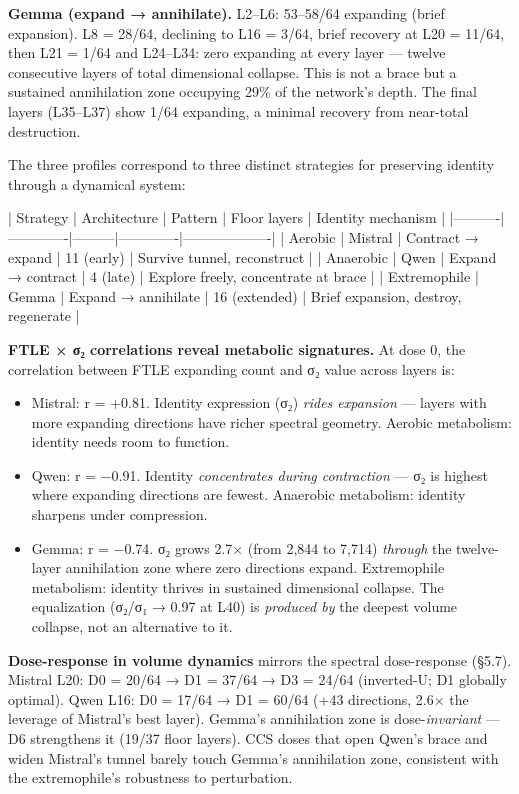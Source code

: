 \documentclass[12pt]{article}
\begin{document}
\textbf{Gemma (expand → annihilate).} L2–L6: 53–58/64 expanding (brief expansion). L8 = 28/64, declining to L16 = 3/64, brief recovery at L20 = 11/64, then L21 = 1/64 and L24–L34: zero expanding at every layer — twelve consecutive layers of total dimensional collapse. This is not a brace but a sustained annihilation zone occupying 29\% of the network's depth. The final layers (L35–L37) show 1/64 expanding, a minimal recovery from near-total destruction.

The three profiles correspond to three distinct strategies for preserving identity through a dynamical system:

| Strategy | Architecture | Pattern | Floor layers | Identity mechanism |
|----------|-------------|---------|-------------|-------------------|
| Aerobic | Mistral | Contract → expand | 11 (early) | Survive tunnel, reconstruct |
| Anaerobic | Qwen | Expand → contract | 4 (late) | Explore freely, concentrate at brace |
| Extremophile | Gemma | Expand → annihilate | 16 (extended) | Brief expansion, destroy, regenerate |

\textbf{FTLE × σ₂ correlations reveal metabolic signatures.} At dose 0, the correlation between FTLE expanding count and σ₂ value across layers is:

\begin{itemize}[leftmargin=*]
\item Mistral: r = +0.81. Identity expression (σ₂) \textit{rides expansion} — layers with more expanding directions have richer spectral geometry. Aerobic metabolism: identity needs room to function.
\item Qwen: r = −0.91. Identity \textit{concentrates during contraction} — σ₂ is highest where expanding directions are fewest. Anaerobic metabolism: identity sharpens under compression.
\item Gemma: r = −0.74. σ₂ grows 2.7× (from 2,844 to 7,714) \textit{through} the twelve-layer annihilation zone where zero directions expand. Extremophile metabolism: identity thrives in sustained dimensional collapse. The equalization (σ₂/σ₁ → 0.97 at L40) is \textit{produced by} the deepest volume collapse, not an alternative to it.
\end{itemize}

\textbf{Dose-response in volume dynamics} mirrors the spectral dose-response (§5.7). Mistral L20: D0 = 20/64 → D1 = 37/64 → D3 = 24/64 (inverted-U; D1 globally optimal). Qwen L16: D0 = 17/64 → D1 = 60/64 (+43 directions, 2.6× the leverage of Mistral's best layer). Gemma's annihilation zone is dose-\textit{invariant} — D6 strengthens it (19/37 floor layers). CCS doses that open Qwen's brace and widen Mistral's tunnel barely touch Gemma's annihilation zone, consistent with the extremophile's robustness to perturbation.
\end{document}
